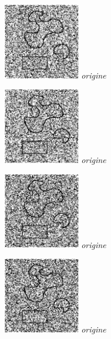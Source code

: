 \documentclass[a4,12pt]{article}
\begin{document}
\begin{minipage}[c]{0.20\linewidth}
	\begin{center}
		\includegraphics[width = 33mm]{./img/p2test_grad_mean_formes2bb10b.jpg}
		\textit{origine}
	\end{center}
\end{minipage}
\begin{minipage}[c]{0.20\linewidth}
	\begin{center}
		\includegraphics[width = 33mm]{./img/p2test_grad_mean_formes2bb10.jpg}
		\textit{origine}
	\end{center}
\end{minipage}
\begin{minipage}[c]{0.20\linewidth}
	\begin{center}
		\includegraphics[width = 33mm]{./img/p2test_grad_mean_formes2bb15b.jpg}
		\textit{origine}
	\end{center}
\end{minipage}
\begin{minipage}[c]{0.20\linewidth}
	\begin{center}
		\includegraphics[width = 33mm]{./img/p2test_grad_mean_formes2bb15.jpg}
		\textit{origine}
	\end{center}
\end{minipage}
\end{document}

